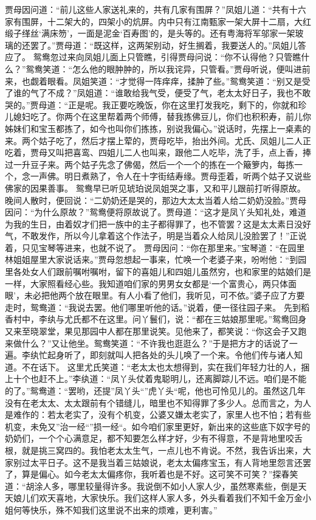 \documentclass[12pt,oneside]{book}
\begin{document}
贾母因问道：“前儿这些人家送礼来的，共有几家有围屏？”凤姐儿道：“共有十六家有围屏，十二架大的，四架小的炕屏。内中只有江南甄家一架大屏十二扇，大红缎子缂丝‘满床笏’，一面是泥金‘百寿图’的，是头等的。还有粤海将军邬家一架玻璃的还罢了。”贾母道：“既这样，这两架别动，好生搁着，我要送人的。”凤姐儿答应了。
鸳鸯忽过来向凤姐儿面上只管瞧，引得贾母问说：“你不认得他？只管瞧什么？”鸳鸯笑道：“怎么他的眼肿肿的，所以我诧异，只管看。”贾母听说，便叫进前来，也觑着眼看。凤姐笑道：“才觉得一阵痒痒，揉肿了些。”鸳鸯笑道：“别又是受了谁的气了不成？”凤姐道：“谁敢给我气受，便受了气，老太太好日子，我也不敢哭的。”贾母道：“正是呢。我正要吃晚饭，你在这里打发我吃，剩下的，你就和珍儿媳妇吃了。你两个在这里帮着两个师傅，替我拣佛豆儿，你们也积积寿，前儿你姊妹们和宝玉都拣了，如今也叫你们拣拣，别说我偏心。”说话时，先摆上一桌素的来。两个姑子吃了，然后才摆上荤的，贾母吃毕，抬出外间。尤氏、凤姐儿二人正吃着，贾母又叫把喜鸾、四姐儿二人也叫来，跟他二人吃毕，洗了手，点上香，捧过一升豆子来。两个姑子先念了佛偈，然后一个一个的拣在一个簸箩内，每拣一个，念一声佛。明日煮熟了，令人在十字街结寿缘。贾母歪着，听两个姑子又说些佛家的因果善事。
鸳鸯早已听见琥珀说凤姐哭之事，又和平儿跟前打听得原故。晚间人散时，便回说：“二奶奶还是哭的，那边大太太当着人给二奶奶没脸。”贾母因问：“为什么原故？”鸳鸯便将原故说了。贾母道：“这才是凤丫头知礼处，难道为我的生日，由着奴才们把一族中的主子都得罪了，也不管罢？这是太太素日没好气，不敢发作，所以今儿拿着这个作法子，明是当着众人给凤儿没脸罢了！”正说着，只见宝琴等进来，也就不说了。
贾母因问：“你在那里来。”宝琴道：“在园里林姐姐屋里大家说话来。”贾母忽想起一事来，忙唤一个老婆子来，吩咐他：“到园里各处女人们跟前嘱咐嘱咐，留下的喜姐儿和四姐儿虽然穷，也和家里的姑娘们是一样，大家照看经心些。我知道咱们家的男男女女都是‘一个富贵心，两只体面眼’，未必把他两个放在眼里。有人小看了他们，我听见，可不依。”婆子应了方要走时，鸳鸯道：“我说去罢。他们哪里听他的话。”说着，便一径往园子来。
先到稻香村中，李纨与尤氏都不在这里。问丫鬟们，说：“都在三姑娘那里呢。”鸳鸯回身又来至晓翠堂，果见那园中人都在那里说笑。见他来了，都笑说：“你这会子又跑来做什么？”又让他坐。鸳鸯笑道：“不许我也逛逛么？”于是把方才的话说了一遍。李纨忙起身听了，即刻就叫人把各处的头儿唤了一个来。令他们传与诸人知道。不在话下。
这里尤氏笑道：“老太太也太想得到，实在我们年轻力壮的人，捆上十个也赶不上。”李纨道：“凤丫头仗着鬼聪明儿，还离脚踪儿不远。咱们是不能的了。”鸳鸯道：“罢哟，还提”凤丫头“”虎丫头“呢，他也可怜见儿的。虽然这几年没有在老太太、太太跟前有个错缝儿，暗里也不知得罪了多少人。总而言之，为人是难作的：若太老实了，没有个机变，公婆又嫌太老实了，家里人也不怕；若有些机变，未免又”治一经“”损一经“。如今咱们家里更好，新出来的这些底下奴字号的奶奶们，一个个心满意足，都不知要怎么样才好，少有不得意，不是背地里咬舌根，就是挑三窝四的。我怕老太太生气，一点儿也不肯说。不然，我告诉出来，大家别过太平日子。这不是我当着三姑娘说，老太太偏疼宝玉，有人背地里怨言还罢了，算是偏心。如今老太太偏疼你，我听着也是不好。这可笑不可笑？”探春笑道：“胡涂人多，哪里较量得许多。我说倒不如小人家人少，虽然寒素些，倒是天天娘儿们欢天喜地，大家快乐。我们这样人家人多，外头看着我们不知千金万金小姐何等快乐，殊不知我们这里说不出来的烦难，更利害。”
\end{document}
